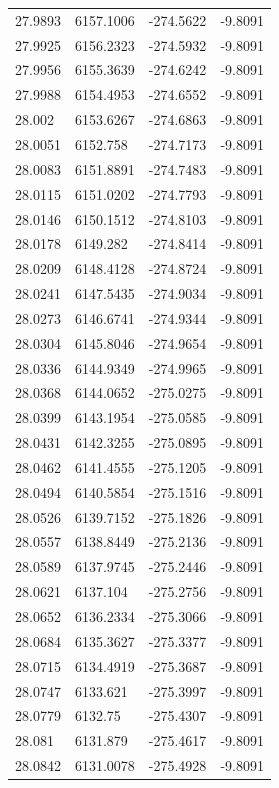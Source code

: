 \begin{table}[H]
\begin{tabular}{llll}
27.9893 & 6157.1006 & -274.5622 & -9.8091 \\
27.9925 & 6156.2323 & -274.5932 & -9.8091 \\
27.9956 & 6155.3639 & -274.6242 & -9.8091 \\
27.9988 & 6154.4953 & -274.6552 & -9.8091 \\
28.002 & 6153.6267 & -274.6863 & -9.8091 \\
28.0051 & 6152.758 & -274.7173 & -9.8091 \\
28.0083 & 6151.8891 & -274.7483 & -9.8091 \\
28.0115 & 6151.0202 & -274.7793 & -9.8091 \\
28.0146 & 6150.1512 & -274.8103 & -9.8091 \\
28.0178 & 6149.282 & -274.8414 & -9.8091 \\
28.0209 & 6148.4128 & -274.8724 & -9.8091 \\
28.0241 & 6147.5435 & -274.9034 & -9.8091 \\
28.0273 & 6146.6741 & -274.9344 & -9.8091 \\
28.0304 & 6145.8046 & -274.9654 & -9.8091 \\
28.0336 & 6144.9349 & -274.9965 & -9.8091 \\
28.0368 & 6144.0652 & -275.0275 & -9.8091 \\
28.0399 & 6143.1954 & -275.0585 & -9.8091 \\
28.0431 & 6142.3255 & -275.0895 & -9.8091 \\
28.0462 & 6141.4555 & -275.1205 & -9.8091 \\
28.0494 & 6140.5854 & -275.1516 & -9.8091 \\
28.0526 & 6139.7152 & -275.1826 & -9.8091 \\
28.0557 & 6138.8449 & -275.2136 & -9.8091 \\
28.0589 & 6137.9745 & -275.2446 & -9.8091 \\
28.0621 & 6137.104 & -275.2756 & -9.8091 \\
28.0652 & 6136.2334 & -275.3066 & -9.8091 \\
28.0684 & 6135.3627 & -275.3377 & -9.8091 \\
28.0715 & 6134.4919 & -275.3687 & -9.8091 \\
28.0747 & 6133.621 & -275.3997 & -9.8091 \\
28.0779 & 6132.75 & -275.4307 & -9.8091 \\
28.081 & 6131.879 & -275.4617 & -9.8091 \\
28.0842 & 6131.0078 & -275.4928 & -9.8091 \\

\end{tabular}
\end{table}
